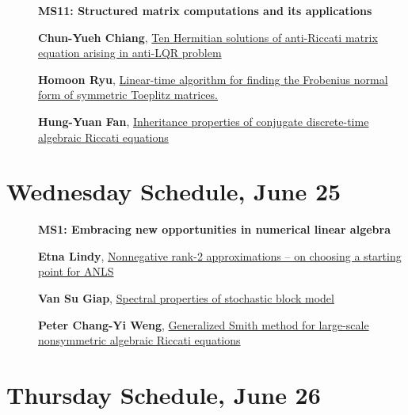 \documentclass[ILAS2025-program.tex]{subfiles}
\begin{document}
        \begin{description}
    \item[] {\color{mstitle}\textbf{MS11: Structured matrix computations and its applications}} 
    \item[] \hypertarget{up0268}{}\textbf{Chun-Yueh Chiang}, \hyperlink{down0268}{Ten Hermitian solutions of anti-Riccati matrix equation arising in anti-LQR problem
}
        \item[] \hypertarget{up0269}{}\textbf{Homoon Ryu}, \hyperlink{down0269}{Linear-time algorithm for finding the Frobenius normal form of symmetric Toeplitz matrices.}
        \item[] \hypertarget{up0270}{}\textbf{Hung-Yuan Fan}, \hyperlink{down0270}{Inheritance properties of conjugate discrete-time algebraic Riccati equations}
        \end{description}
    \newpage

\section*{Wednesday Schedule, June 25 }
        
        \begin{description}
    \item[] {\color{mstitle}\textbf{MS1: Embracing new opportunities in numerical linear algebra}} 
    \item[] \hypertarget{up0271}{}\textbf{Etna Lindy}, \hyperlink{down0271}{Nonnegative rank-2 approximations -- on choosing a starting point for ANLS}
        \item[] \hypertarget{up0272}{}\textbf{Van Su Giap}, \hyperlink{down0272}{Spectral properties of stochastic block model}
        \item[] \hypertarget{up0273}{}\textbf{Peter Chang-Yi Weng}, \hyperlink{down0273}{Generalized Smith method for large-scale nonsymmetric algebraic Riccati equations}
        \end{description}
    \newpage

\section*{Thursday Schedule, June 26 }
        
\end{document}
